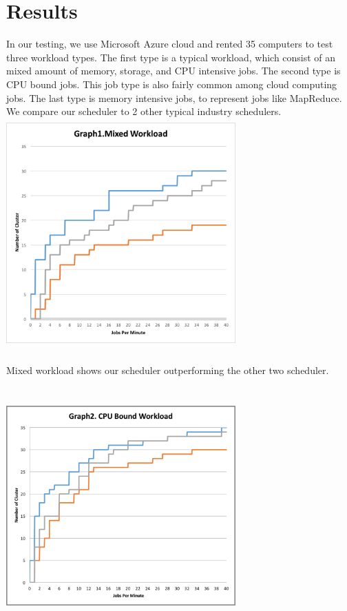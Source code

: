 \documentclass[conference]{IEEEtran}
\begin{document}
\section{Results}
In our testing, we use Microsoft Azure cloud and rented 35 computers to test three workload types. The first type is a typical workload, which consist of an mixed amount of memory, storage, and CPU intensive jobs. The second type is CPU bound jobs. This job type is also fairly common among cloud computing jobs. The last type is memory intensive jobs, to represent jobs like MapReduce. We compare our scheduler to 2 other typical industry schedulers.\\
\newline
\includegraphics[width=8.8cm,height=8.8cm,keepaspectratio]{graph1.png}\\\\
Mixed workload shows our scheduler outperforming the other two scheduler.\\\\
\newline
\includegraphics[width=8.8cm,height=8.8cm,keepaspectratio]{graph2.png}\\\\
\end{document}
